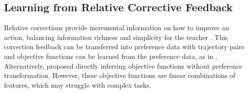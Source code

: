 \subsection{Learning from Relative Corrective Feedback}


Relative corrections provide incremental information on how to improve an action, balancing information richness and simplicity for the teacher \cite{2022_IIL_survey}. 
This correction feedback can be transferred into preference data with trajectory pairs and
objective functions can be learned from the preference data, as in \cite{2015_IJRR_Preference_traj_ranking, 2017_pHRI_correction_learning_objective, 2018_uncertainty_correction_objective}.
Alternatively, \cite{2022_TRO_correction_objective_function} proposed directly inferring objective functions without preference transformation.
However, these objective functions are linear combinations of features, which may struggle with complex tasks.

